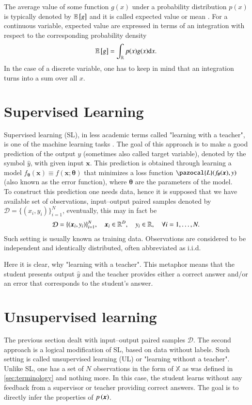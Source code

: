 The average value of some function $g(x)$ under a probability distribution $p(x)$ is typically denoted by $\mathbb{E}\left[ g \right]$ and it is called expected value or mean \cite{bishop}. For a continuous variable, expected value are expressed in terms of an integration with respect to the corresponding probability density
\begin{equation}
	\mathbb{E}\left[ g \right] = \int_{\mathbb{R}} p(x)g(x)\mathrm{d}{x}.
\end{equation} 
In the case of a discrete variable, one has to keep in mind that an integration turns into a sum over all $x$.   

\section{Supervised Learning}
Supervised learning (SL), in less academic terms called "learning with a teacher", is one of the machine learning tasks  \cite{supervised}.  The goal of this approach is to make a good prediction of the output $y$ (sometimes also called target variable), denoted by the symbol $\hat{y}$, with given input $\boldsymbol{x}$. This prediction is obtained through learning a model $f_{\boldsymbol{\theta}}\left(\boldsymbol{x}\right)\equiv f\left(\boldsymbol{x}; \boldsymbol{\theta}\right)$ that minimizes a loss function  $\pazocal{L}(f_{\boldsymbol{\theta}}(\boldsymbol{x}), y)$ (also known as the error function), where $\boldsymbol{\theta}$ are the parameters of the model. \\
To construct this prediction one needs data, hence it is supposed that we have available set of observations, input--output paired samples denoted by $\mathcal{D} = \lbrace \left(x_i , y_i \right)\rbrace_{i=1}^N$, eventually, this may in fact be 
\begin{equation}
\mathcal{D} = \lbrace\left( \boldsymbol{x}_i , y_i \right)\rbrace_{i=1}^N,\quad \boldsymbol{x}_i \in \mathbb{R}^D,\quad y_i \in \mathbb{R},\quad\forall i = 1,\dots,N.
\end{equation}
Such setting is usually known as training data.  Observations are considered to be independent and identically distributed, often abbreviated as i.i.d. 

Here it is clear, why "learning with a teacher". This metaphor means that the student presents output $\widehat{y}$ and the teacher provides either a correct answer and/or an error that corresponds to the student's answer. 

\section{Unsupervised learning}
The previous section dealt with input--output paired samples $\mathcal{D}$. The second approach is a logical modification of SL, based on data without labels. Such setting is called unsupervised learning (UL) or "learning without a teacher". Unlike SL, one has a set of $N$ observations in the form of $\mathbb{X}$ as was defined in \ref{sec:terminology} and nothing more. In this case, the student learns without any feedback from a supervisor or teacher providing correct answers. The goal is to directly infer the properties of $p\left( \boldsymbol{x} \right)$.
